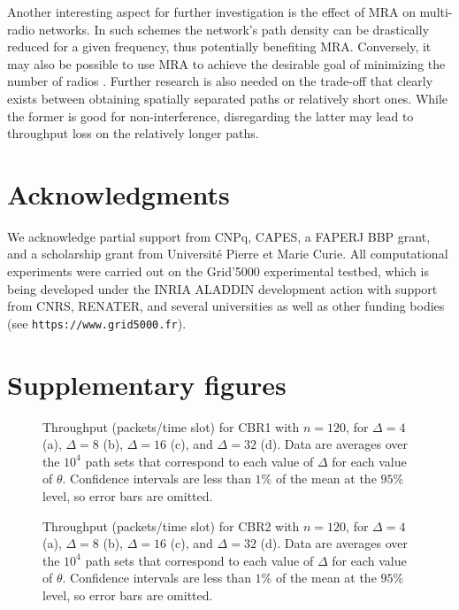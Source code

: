 \documentclass{article}
\begin{document}
Another interesting aspect for further investigation is the effect of MRA on
multi-radio networks. In such schemes the network's path density can be
drastically reduced for a given frequency, thus potentially benefiting MRA.
Conversely, it may also be possible to use MRA to achieve the desirable goal of
minimizing the number of radios \cite{Bahl2004,Raniwala2005}. Further research
is also needed on the trade-off that clearly exists between obtaining spatially
separated paths or relatively short ones. While the former is good for
non-interference, disregarding the latter may lead to throughput loss on the
relatively longer paths.

\section*{Acknowledgments}

We acknowledge partial support from CNPq, CAPES, a FAPERJ BBP grant, and a
scholarship grant from Universit\'{e} Pierre et Marie Curie. All computational
experiments were carried out on the Grid'5000 experimental testbed, which is
being developed under the INRIA ALADDIN development action with support from
CNRS, RENATER, and several universities as well as other funding bodies (see
\texttt{https://www.grid5000.fr}).




\newpage
\appendix
\setcounter{figure}{0}
\renewcommand\thefigure{\Alph{section}.\arabic{figure}}
\section{Supplementary figures}
\begin{figure}[t]
\centering
{}
\caption[Throughput (packets/time slot) for CBR1]{Throughput (packets/time slot)
for CBR1 with $n=120$, for $\Delta=4$ (a), $\Delta=8$ (b), $\Delta=16$ (c), and
$\Delta=32$ (d). Data are averages over the $10^4$ path sets that correspond to
each value of $\Delta$ for each value of $\theta$. Confidence intervals are less
than $1\%$ of the mean at the $95\%$ level, so error bars are omitted.}
\label{figureS1}
\end{figure}

\begin{figure}[p]
\centering
{}
\caption[Throughput (packets/time slot) for CBR2]{Throughput (packets/time slot)
for CBR2 with $n=120$, for $\Delta=4$ (a), $\Delta=8$ (b), $\Delta=16$ (c), and
$\Delta=32$ (d). Data are averages over the $10^4$ path sets that correspond to
each value of $\Delta$ for each value of $\theta$. Confidence intervals are less
than $1\%$ of the mean at the $95\%$ level, so error bars are omitted.}
\label{figureS2}
\end{figure}
\end{document}
